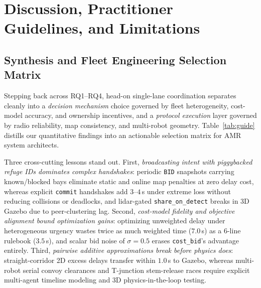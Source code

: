 \documentclass[letterpaper,journal]{IEEEtran}
\newcommand{\cb}{\texttt{cost\_bid}}
\begin{document}
\section{Discussion, Practitioner Guidelines, and Limitations}\label{sec:disc}

\subsection{Synthesis and Fleet Engineering Selection Matrix}
Stepping back across RQ1--RQ4, head-on single-lane coordination separates cleanly into a \emph{decision mechanism} choice governed by fleet heterogeneity, cost-model accuracy, and ownership incentives, and a \emph{protocol execution} layer governed by radio reliability, map consistency, and multi-robot geometry. Table~\ref{tab:guide} distills our quantitative findings into an actionable selection matrix for AMR system architects.

Three cross-cutting lessons stand out. First, \emph{broadcasting intent with piggybacked refuge IDs dominates complex handshakes}: periodic \texttt{BID} snapshots carrying known/blocked bays eliminate static and online map penalties at zero delay cost, whereas explicit \texttt{commit} handshakes add $3$--$4$\,s under extreme loss without reducing collisions or deadlocks, and lidar-gated \texttt{share\_on\_detect} breaks in 3D Gazebo due to peer-clustering lag. Second, \emph{cost-model fidelity and objective alignment bound optimization gains}: optimizing unweighted delay under heterogeneous urgency wastes twice as much weighted time ($7.0$\,s) as a 6-line rulebook ($3.5$\,s), and scalar bid noise of $\sigma=0.5$ erases \cb's advantage entirely. Third, \emph{pairwise additive approximations break before physics does}: straight-corridor 2D excess delays transfer within $1.0$\,s to Gazebo, whereas multi-robot serial convoy clearances and T-junction stem-release races require explicit multi-agent timeline modeling and 3D physics-in-the-loop testing.
\end{document}
